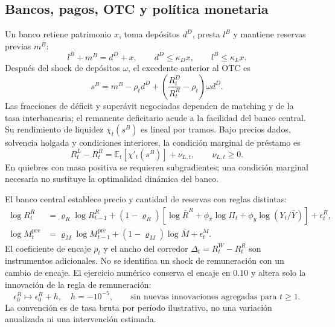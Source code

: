 \subsection{Bancos, pagos, OTC y política monetaria}
Un banco retiene patrimonio \(x\), toma depósitos \(d^D\),
presta \(l^B\) y mantiene reservas previas \(m^B\):
\begin{equation}\label{eq:compact_balance}
l^B+m^B=d^D+x,\qquad
d^D\leq\kappa_Dx,\qquad l^B\leq\kappa_Lx.
\end{equation}
Después del shock de depósitos \(\omega\), el excedente anterior
al OTC es
\begin{equation}\label{eq:compact_surplus}
s^B=m^B-\rho_td^D+
\left(\frac{R_t^D}{R_t^R}-\rho_t\right)\omega d^D.
\end{equation}
Las fracciones de déficit y superávit negociadas dependen de matching
y de la tasa interbancaria; el remanente deficitario acude a la
facilidad del banco central. Su rendimiento de liquidez
\(\chi_t(s^B)\) es lineal por tramos. Bajo precios dados, solvencia
holgada y condiciones interiores, la condición marginal de préstamo es
\begin{equation}\label{eq:compact_bank_foc}
R_t^L-R_t^R=\mathbb E_t[\chi'_t(s^B)]+\nu_{L,t},
\qquad\nu_{L,t}\geq0.
\end{equation}
En quiebres con masa positiva se requieren subgradientes; una
condición marginal necesaria no sustituye la optimalidad dinámica
del banco.

El banco central establece precio y cantidad de reservas con reglas
distintas:
\begin{align}
\log R_t^R&=\varrho_R\log R_{t-1}^R+
(1-\varrho_R)\left[
\log\bar R^R+\phi_\pi\log\Pi_t+
\phi_y\log(Y_t/\bar Y)\right]+\epsilon_t^R,
\label{eq:compact_rate_rule}\\
\log M_t^{\mathrm{pre}}&=\varrho_M\log M_{t-1}^{\mathrm{pre}}
+(1-\varrho_M)\log\bar M+\epsilon_t^M.
\label{eq:compact_quantity_rule}
\end{align}
El coeficiente de encaje \(\rho_t\) y el ancho del corredor
\(\Delta_t=R_t^W-R_t^R\) son instrumentos adicionales. No se
identifica un shock de remuneración con un cambio de encaje.
El ejercicio numérico conserva el encaje en \(0.10\) y altera
solo la innovación de la regla de remuneración:
\begin{equation}\label{eq:compact_shock}
\epsilon_0^R\longmapsto\epsilon_0^R+h,\quad
h=-10^{-5},\qquad
\text{sin nuevas innovaciones agregadas para }t\geq1.
\end{equation}
La convención es de tasa bruta por período ilustrativo, no una
variación anualizada ni una intervención estimada.

